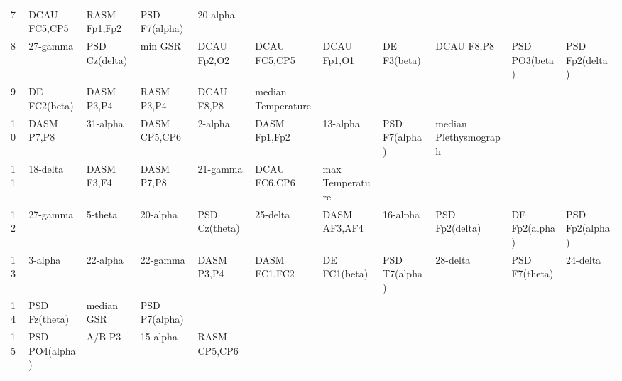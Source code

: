 \begin{landscape}
\begin{table}[]
\begin{tabular}{l|llllllll}
7        & DCAU FC5,CP5          & RASM Fp1,Fp2          & PSD F7(alpha)        & 20-alpha                &                         &                      &                      &                       &                       &                    \\
8        & 27-gamma              & PSD Cz(delta)         & min GSR              & DCAU Fp2,O2             & DCAU FC5,CP5            & DCAU Fp1,O1          & DE F3(beta)          & DCAU F8,P8            & PSD PO3(beta)         & PSD Fp2(delta)     \\
9        & DE FC2(beta)          & DASM P3,P4            & RASM P3,P4           & DCAU F8,P8              & median Temperature      &                      &                      &                       &                       &                    \\
10       & DASM P7,P8            & 31-alpha              & DASM CP5,CP6         & 2-alpha                 & DASM Fp1,Fp2            & 13-alpha             & PSD F7(alpha)        & median Plethysmograph &                       &                    \\
11       & 18-delta              & DASM F3,F4            & DASM P7,P8           & 21-gamma                & DCAU FC6,CP6            & max Temperature      &                      &                       &                       &                    \\
12       & 27-gamma              & 5-theta               & 20-alpha             & PSD Cz(theta)           & 25-delta                & DASM AF3,AF4         & 16-alpha             & PSD Fp2(delta)        & DE Fp2(alpha)         & PSD Fp2(alpha)     \\
13       & 3-alpha               & 22-alpha              & 22-gamma             & DASM P3,P4              & DASM FC1,FC2            & DE FC1(beta)         & PSD T7(alpha)        & 28-delta              & PSD F7(theta)         & 24-delta           \\
14       & PSD Fz(theta)         & median GSR            & PSD P7(alpha)        &                         &                         &                      &                      &                       &                       &                    \\
15       & PSD PO4(alpha)        & A/B P3                & 15-alpha             & RASM CP5,CP6            &                         &                      &                      &                       &                       &                    \\

\end{tabular}
\end{table}
\end{landscape}
